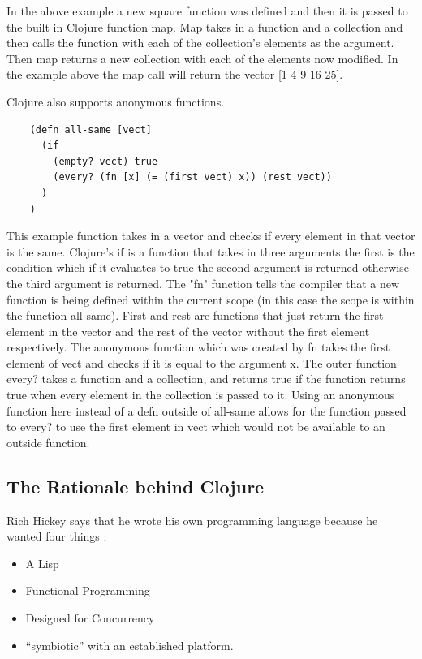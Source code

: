 \documentclass[12pt]{article}
\begin{document}
	In the above example a new square function was defined and then it is passed to the built in Clojure function map. Map takes in a function and a collection and then calls the function with each of the collection's elements as the argument. Then map returns a new collection with each of the elements now modified. In the example above the map call will return the vector [1 4 9 16 25].
	
	Clojure also supports anonymous functions. 
	
	\begin{verbatim}
	(defn all-same [vect]
      (if 
        (empty? vect) true
        (every? (fn [x] (= (first vect) x)) (rest vect)) 
      )
    )
	\end{verbatim}
	
	This example function takes in a vector and checks if every element in that vector is the same. Clojure's if is a function that takes in three arguments the first is the condition which if it evaluates to true the second argument is returned otherwise the third argument is returned. The "fn" function tells the compiler that a new function is being defined within the current scope (in this case the scope is within the function all-same). First and rest are functions that just return the first element in the vector and the rest of the vector without the first element respectively. The anonymous function which was created by fn takes the first element of vect and checks if it is equal to the argument x. The outer function every? takes a function and a collection, and returns true if the function returns true when every element in the collection is passed to it. Using an anonymous function here instead of a defn outside of all-same allows for the function passed to every? to use the first element in vect which would not be available to an outside function.
	
	\subsection{The Rationale behind Clojure}
	Rich Hickey says that he wrote his own programming language because he wanted four things \cite{cloj:rationale}:
	\begin{itemize}
		\item A Lisp
		\item Functional Programming
		\item Designed for Concurrency
		\item ``symbiotic'' with an established platform.
	\end{itemize}
	
\end{document}
